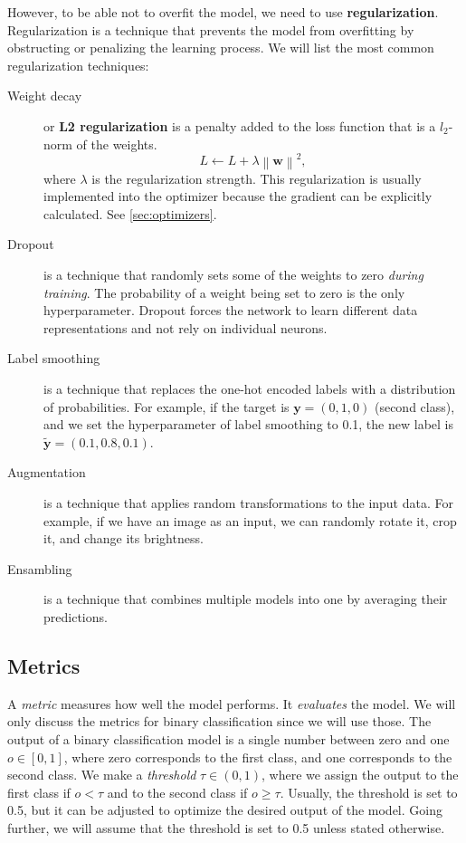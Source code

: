 However, to be able not to overfit the model, we need to use \textbf{regularization}. 
Regularization is a technique that prevents the model from overfitting by obstructing or penalizing the learning process.
We will list the most common regularization techniques:
\begin{description}
    \item[Weight decay] or \textbf{L2 regularization} is a penalty added to the loss function that is a $l_2$-norm of the weights.
    \begin{equation}
        \label{eq:weight_decay}
        L \gets L + \lambda \left\lVert \pmb{w} \right\rVert^2,
    \end{equation}
    where $\lambda$ is the regularization strength.
    This regularization is usually implemented into the optimizer because the gradient can be explicitly calculated. 
    See \cref{sec:optimizers}. 
    \item[Dropout] is a technique that randomly sets some of the weights to zero \emph{during training}.  
    The probability of a weight being set to zero is the only hyperparameter.
    Dropout forces the network to learn different data representations and not rely on individual neurons.
    \item[Label smoothing] is a technique that replaces the one-hot encoded labels with a distribution of probabilities.
    For example, if the target is $\pmb{y} = (0, 1, 0)$ (second class), and we set the hyperparameter of label smoothing to 0.1, the new label is $\tilde{\pmb{y}} = (0.1, 0.8, 0.1)$.
    \item[Augmentation] is a technique that applies random transformations to the input data.
    For example, if we have an image as an input, we can randomly rotate it, crop it, and change its brightness.
    \item[Ensambling] is a technique that combines multiple models into one by averaging their predictions.
\end{description}


\subsection{Metrics}
\label{sec:metrics}
A \emph{metric} measures how well the model performs. 
It \emph{evaluates} the model.
We will only discuss the metrics for binary classification since we will use those.
The output of a binary classification model is a single number between zero and one $o \in [0,1]$, where zero corresponds to the first class, and one corresponds to the second class.
We make a \emph{threshold} $\tau \in (0,1)$, where we assign the output to the first class if $o < \tau$ and to the second class if $o \geq \tau$. 
Usually, the threshold is set to 0.5, but it can be adjusted to optimize the desired output of the model.
Going further, we will assume that the threshold is set to 0.5 unless stated otherwise.

